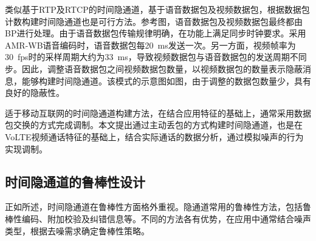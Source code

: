 
类似基于RTP及RTCP的时间隐通道，基于语音数据包及视频数据包，根据数据包计数构建时间隐通道也是可行方法。参考图，语音数据包及视频数据包最终都由BP进行处理。由于语音数据包传输规律明确，在功能上满足同步时钟要求。采用{AMR-WB}语音编码时，语音数据包每{20\ ms}发送一次。另一方面，视频帧率为{30\ fps}时的采样周期大约为{33\ ms}，导致视频数据包与语音数据包的发送周期不同步。因此，调整语音数据包之间视频数据包数量，以视频数据包的数量表示隐蔽消息，能够构建时间隐通道。该模式的示意图如图，由于调整的数据包数量少，具有良好的隐蔽性。

适于移动互联网的时间隐通道构建方法，在结合应用特征的基础上，通常采用数据包交换的方式完成调制。本文提出通过主动丢包的方式构建时间隐通道，也是在VoLTE视频通话特征的基础上，结合实际通话的数据分析，通过模拟噪声的行为实现调制。

\subsection{时间隐通道的鲁棒性设计}
\label{chap:backinfo:ctc:robustness}
正如所述，时间隐通道在鲁棒性方面格外重视。隐通道常用的鲁棒性方法，包括鲁棒性编码、附加校验及纠错信息等。不同的方法各有优势，在应用中通常结合噪声类型，根据去噪需求确定鲁棒性策略。

